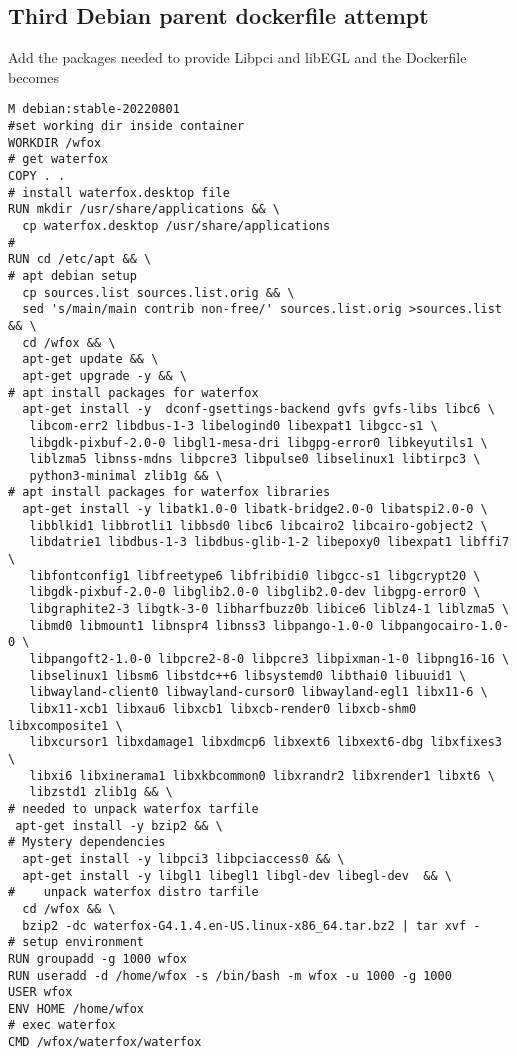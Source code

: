 \documentclass{article}  %
\begin{document}
\subsection{Third Debian parent dockerfile attempt}
 Add the packages needed to provide Libpci and libEGL and the Dockerfile becomes
\begin{verbatim}
M debian:stable-20220801
#set working dir inside container
WORKDIR /wfox
# get waterfox
COPY . .
# install waterfox.desktop file
RUN mkdir /usr/share/applications && \
  cp waterfox.desktop /usr/share/applications
#
RUN cd /etc/apt && \
# apt debian setup
  cp sources.list sources.list.orig && \
  sed 's/main/main contrib non-free/' sources.list.orig >sources.list && \
  cd /wfox && \
  apt-get update && \
  apt-get upgrade -y && \
# apt install packages for waterfox
  apt-get install -y  dconf-gsettings-backend gvfs gvfs-libs libc6 \
   libcom-err2 libdbus-1-3 libelogind0 libexpat1 libgcc-s1 \
   libgdk-pixbuf-2.0-0 libgl1-mesa-dri libgpg-error0 libkeyutils1 \
   liblzma5 libnss-mdns libpcre3 libpulse0 libselinux1 libtirpc3 \
   python3-minimal zlib1g && \
# apt install packages for waterfox libraries
  apt-get install -y libatk1.0-0 libatk-bridge2.0-0 libatspi2.0-0 \
   libblkid1 libbrotli1 libbsd0 libc6 libcairo2 libcairo-gobject2 \
   libdatrie1 libdbus-1-3 libdbus-glib-1-2 libepoxy0 libexpat1 libffi7 \
   libfontconfig1 libfreetype6 libfribidi0 libgcc-s1 libgcrypt20 \
   libgdk-pixbuf-2.0-0 libglib2.0-0 libglib2.0-dev libgpg-error0 \
   libgraphite2-3 libgtk-3-0 libharfbuzz0b libice6 liblz4-1 liblzma5 \
   libmd0 libmount1 libnspr4 libnss3 libpango-1.0-0 libpangocairo-1.0-0 \
   libpangoft2-1.0-0 libpcre2-8-0 libpcre3 libpixman-1-0 libpng16-16 \
   libselinux1 libsm6 libstdc++6 libsystemd0 libthai0 libuuid1 \
   libwayland-client0 libwayland-cursor0 libwayland-egl1 libx11-6 \
   libx11-xcb1 libxau6 libxcb1 libxcb-render0 libxcb-shm0 libxcomposite1 \
   libxcursor1 libxdamage1 libxdmcp6 libxext6 libxext6-dbg libxfixes3 \
   libxi6 libxinerama1 libxkbcommon0 libxrandr2 libxrender1 libxt6 \
   libzstd1 zlib1g && \
# needed to unpack waterfox tarfile
 apt-get install -y bzip2 && \
# Mystery dependencies
  apt-get install -y libpci3 libpciaccess0 && \
  apt-get install -y libgl1 libegl1 libgl-dev libegl-dev  && \
#    unpack waterfox distro tarfile
  cd /wfox && \
  bzip2 -dc waterfox-G4.1.4.en-US.linux-x86_64.tar.bz2 | tar xvf -
# setup environment
RUN groupadd -g 1000 wfox
RUN useradd -d /home/wfox -s /bin/bash -m wfox -u 1000 -g 1000
USER wfox
ENV HOME /home/wfox
# exec waterfox
CMD /wfox/waterfox/waterfox
\end{verbatim}
\end{document}
